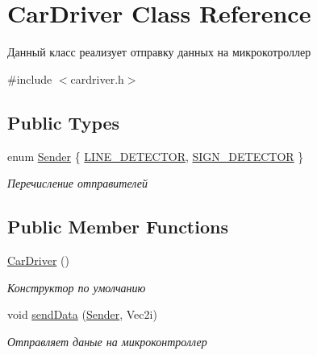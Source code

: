 \hypertarget{class_car_driver}{\section{Car\+Driver Class Reference}
\label{class_car_driver}
}


Данный класс реализует отправку данных на микрокотроллер  




{\ttfamily \#include $<$cardriver.\+h$>$}

\subsection*{Public Types}
\begin{DoxyCompactItemize}
\item 
enum \hyperlink{class_car_driver_a33fd0b7844018f8894fcbdb4c4edd0fe}{Sender} \{ \hyperlink{class_car_driver_a33fd0b7844018f8894fcbdb4c4edd0fea6d3ce5a8c8d7edb78a78e72cd323337e}{L\+I\+N\+E\+\_\+\+D\+E\+T\+E\+C\+T\+O\+R}, 
\hyperlink{class_car_driver_a33fd0b7844018f8894fcbdb4c4edd0fea2d884b64ff97cf1faad6c92441ebb85a}{S\+I\+G\+N\+\_\+\+D\+E\+T\+E\+C\+T\+O\+R}
 \}
\begin{DoxyCompactList}\small\item\em Перечисление отправителей \end{DoxyCompactList}\end{DoxyCompactItemize}
\subsection*{Public Member Functions}
\begin{DoxyCompactItemize}
\item 
\hypertarget{class_car_driver_a84e7f1c674b689149c1ca608b1c1bc87}{\hyperlink{class_car_driver_a84e7f1c674b689149c1ca608b1c1bc87}{Car\+Driver} ()}\label{class_car_driver_a84e7f1c674b689149c1ca608b1c1bc87}

\begin{DoxyCompactList}\small\item\em Конструктор по умолчанию \end{DoxyCompactList}\item 
\hypertarget{class_car_driver_a1c70b29ad7b883c2d198a956bb66e800}{void \hyperlink{class_car_driver_a1c70b29ad7b883c2d198a956bb66e800}{send\+Data} (\hyperlink{class_car_driver_a33fd0b7844018f8894fcbdb4c4edd0fe}{Sender}, Vec2i)}\label{class_car_driver_a1c70b29ad7b883c2d198a956bb66e800}

\begin{DoxyCompactList}\small\item\em Отправляет даные на микроконтроллер \end{DoxyCompactList}\end{DoxyCompactItemize}


